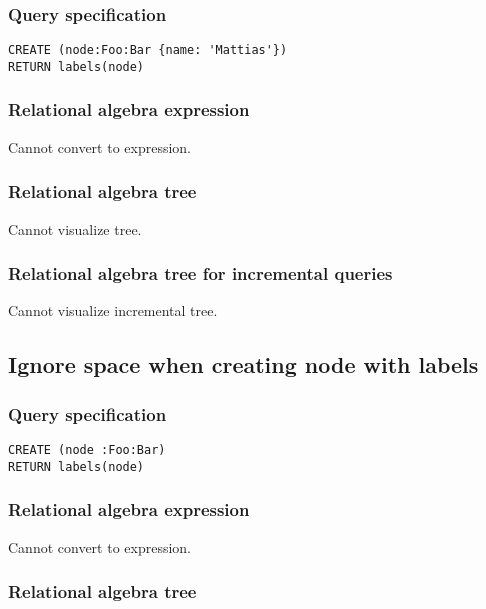\subsubsection*{Query specification}

\begin{lstlisting}
CREATE (node:Foo:Bar {name: 'Mattias'})
RETURN labels(node)
\end{lstlisting}

\subsubsection*{Relational algebra expression}

Cannot convert to expression.

\subsubsection*{Relational algebra tree}

Cannot visualize tree.

\subsubsection*{Relational algebra tree for incremental queries}

Cannot visualize incremental tree.

\subsection{Ignore space when creating node with labels}

\subsubsection*{Query specification}

\begin{lstlisting}
CREATE (node :Foo:Bar)
RETURN labels(node)
\end{lstlisting}

\subsubsection*{Relational algebra expression}

Cannot convert to expression.

\subsubsection*{Relational algebra tree}

